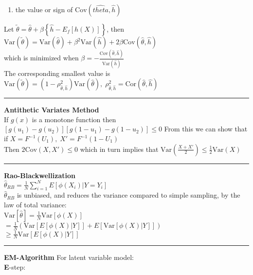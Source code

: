 \documentclass[10pt]{article} %
\begin{document}
\begin{multicols}{4}
{\begin{flushleft}
\begin{enumerate}
                \item the value or sign of \(\text{Cov}(\hat{theta},\hat{h})\)
            \end{enumerate}
            Let \(\tilde{\theta} = \hat{\theta} + \beta\left\{\hat{h} - E_f[h(X)]\right\}\), then
            \(\text{Var}(\tilde{\theta}) = \text{Var}(\hat{\theta}) + \beta^2 \text{Var}(\hat{h}) + 2 \beta\text{Cov}(\hat{\theta},\hat{h})\)\\
            which is minimized when \(\beta = -\frac{\text{Cov}(\hat{\theta},\hat{h})}{\text{Var}(\hat{h})}\)\\
            The corresponding smallest value is  \(\text{Var}(\tilde{\theta}) = (1-\rho^2_{\hat{\theta},\hat{h}})\text{Var}(\hat{\theta}), \; \rho^2_{\hat{\theta},\hat{h}} = \text{Cor}(\hat{\theta},\hat{h})\)
            \hrule
            \vspace{0.1cm}
            \textbf{Antithetic Variates Method}\\
            If \(g(x)\) is a monotone function then\\
            \([g(u_1)-g(u_2)][g(1-u_1)-g(1-u_2)] \leq 0\)
            From this we can show that if \(X = F^{-1}(U_1),\;X' = F^{-1}(1-U_1)\)\\
            Then \(2\text{Cov}(X,X') \leq 0\) which in turn implies that
            \(\text{Var}\left(\frac{X+X'}{2}\right) \leq \frac{1}{2}\text{Var}(X)\)
            \hrule
            \vspace{0.1cm}
            \textbf{Rao-Blackwellization}\\
            \(
            \hat{\theta}_{RB} = \frac{1}{N}\sum_{i=1}^N E[\phi(X_i)|Y=Y_i]
            \)\\
            \(\hat{\theta}_{RB}\) is unbiased, and reduces the variance compared to
            simple sampling, by the law of total variance:\\
            \(
            \text{Var}[\hat{\theta}] = \frac{1}{N}\text{Var}[\phi(X)]
            \)\\
            \(
            = \frac{1}{N}\left(\text{Var}[E[\phi(X)|Y]] + E[\text{Var}[\phi(X)|Y]]\right)
            \)\\
            \(
            \geq \frac{1}{N}\text{Var}[E[\phi(X)|Y]]
            \)
            \vspace{0.1cm}
            \hrule
            \vspace{0.1cm}
            \textbf{EM-Algorithm}
            For latent variable model:\\
            \textbf{E}-step:\\

\end{flushleft}}
\end{multicols}
\end{document}
